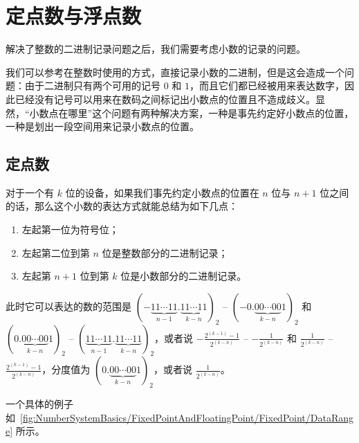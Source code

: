 \section{定点数与浮点数}\label{sec:NumberSystemBasics/FixedPointAndFloatingPoint}
    解决了整数的二进制记录问题之后，我们需要考虑小数的记录的问题。

    我们可以参考在整数时使用的方式，直接记录小数的二进制，但是这会造成一个问题：由于二进制只有两个可用的记号 $0$ 和 $1$，而且它们都已经被用来表达数字，因此已经没有记号可以用来在数码之间标记出小数点的位置且不造成歧义。显然，“小数点在哪里”这个问题有两种解决方案，一种是事先约定好小数点的位置，一种是划出一段空间用来记录小数点的位置。

    \subsection{定点数}\label{subsec:NumberSystemBasics/FixedPointAndFloatingPoint/FixedPoint}
        对于一个有 $k$ 位的设备，如果我们事先约定小数点的位置在 $n$ 位与 $n + 1$ 位之间的话，那么这个小数的表达方式就能总结为如下几点：
        \begin{enumerate}
            \item 左起第一位为符号位；
            \item 左起第二位到第 $n$ 位是整数部分的二进制记录；
            \item 左起第 $n + 1$ 位到第 $k$ 位是小数部分的二进制记录。
        \end{enumerate}

        此时它可以表达的数的范围是 $(-\underbrace{11 \cdots 11}_{n-1}.\underbrace{11 \cdots 11}_{k-n})_2$ -- $(-0.\underbrace{00 \cdots 00}_{k-n}1)_2$ 和 $(0.\underbrace{00 \cdots 00}_{k-n}1)_2$ -- $(\underbrace{11 \cdots 11}_{n-1}.\underbrace{11 \cdots 11}_{k-n})_2$，或者说 $-\frac{2^{(k-1)}-1}{2^{(k-n)}}$ -- $-\frac{1}{2^{(k-n)}}$ 和 $\frac{1}{2^{(k-n)}}$ -- $\frac{2^{(k-1)}-1}{2^{(k-n)}}$，分度值为 $(0.\underbrace{00 \cdots 00}_{k-n}1)_2$，或者说 $\frac{1}{2^{(k-n)}}$。

        一个具体的例子如~\ref{fig:NumberSystemBasics/FixedPointAndFloatingPoint/FixedPoint/DataRange} 所示。

